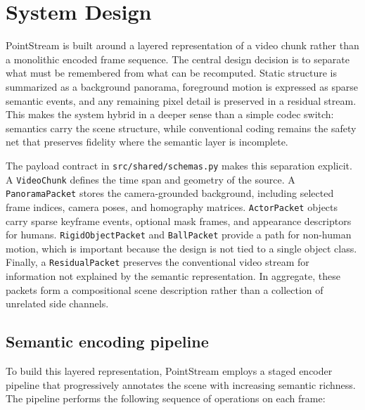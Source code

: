 \documentclass[manuscript, screen]{acmart}
\begin{document}
\section{System Design}
PointStream is built around a layered representation of a video chunk rather than a monolithic encoded frame sequence. The central design decision is to separate what must be remembered from what can be recomputed. Static structure is summarized as a background panorama, foreground motion is expressed as sparse semantic events, and any remaining pixel detail is preserved in a residual stream. This makes the system hybrid in a deeper sense than a simple codec switch: semantics carry the scene structure, while conventional coding remains the safety net that preserves fidelity where the semantic layer is incomplete.

The payload contract in \texttt{src/shared/schemas.py} makes this separation explicit. A \texttt{VideoChunk} defines the time span and geometry of the source. A \texttt{PanoramaPacket} stores the camera-grounded background, including selected frame indices, camera poses, and homography matrices. \texttt{ActorPacket} objects carry sparse keyframe events, optional mask frames, and appearance descriptors for humans. \texttt{RigidObjectPacket} and \texttt{BallPacket} provide a path for non-human motion, which is important because the design is not tied to a single object class. Finally, a \texttt{ResidualPacket} preserves the conventional video stream for information not explained by the semantic representation. In aggregate, these packets form a compositional scene description rather than a collection of unrelated side channels.

\subsection{Semantic encoding pipeline}

To build this layered representation, PointStream employs a staged encoder pipeline that progressively annotates the scene with increasing semantic richness. The pipeline performs the following sequence of operations on each frame:
\end{document}
